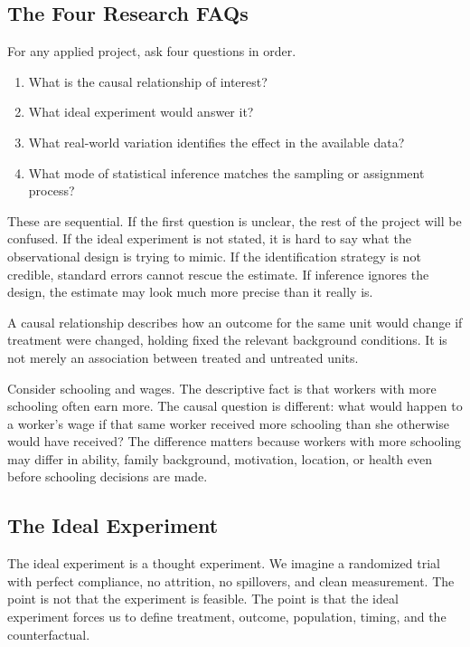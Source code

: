 \subsection{The Four Research FAQs}

For any applied project, ask four questions in order.
\begin{enumerate}
    \item What is the causal relationship of interest?
    \item What ideal experiment would answer it?
    \item What real-world variation identifies the effect in the available data?
    \item What mode of statistical inference matches the sampling or assignment
    process?
\end{enumerate}

These are sequential. If the first question is unclear, the rest of the project
will be confused. If the ideal experiment is not stated, it is hard to say what
the observational design is trying to mimic. If the identification strategy is
not credible, standard errors cannot rescue the estimate. If inference ignores
the design, the estimate may look much more precise than it really is.

\begin{defN}
A causal relationship describes how an outcome for the same unit would change
if treatment were changed, holding fixed the relevant background conditions.
It is not merely an association between treated and untreated units.
\end{defN}

Consider schooling and wages. The descriptive fact is that workers with more
schooling often earn more. The causal question is different: what would happen
to a worker's wage if that same worker received more schooling than she
otherwise would have received? The difference matters because workers with more
schooling may differ in ability, family background, motivation, location, or
health even before schooling decisions are made.

\subsection{The Ideal Experiment}

The ideal experiment is a thought experiment. We imagine a randomized trial with
perfect compliance, no attrition, no spillovers, and clean measurement. The
point is not that the experiment is feasible. The point is that the ideal
experiment forces us to define treatment, outcome, population, timing, and the
counterfactual.

